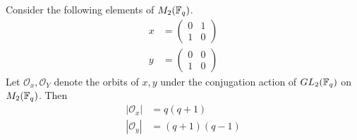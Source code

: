 \documentclass{amsart}
\begin{document}
\begin{lemma}\label{orbit-sizes}
    Consider the following elements of $M_2(\protect\mathbb{F}_q)$.
    \begin{align*}
        x &= 
        \begin{pmatrix}
            0 & 1 \\
            1 & 0
        \end{pmatrix} \\
        y &=
        \begin{pmatrix}
            0 & 0 \\
            1 & 0
        \end{pmatrix}
    \end{align*}
    Let $\mathcal{O}_x, \mathcal{O}_Y$ denote the orbits of $x, y$ under the conjugation action of $GL_2(\protect\mathbb{F}_q)$ on $M_2(\protect\mathbb{F}_q)$. Then
    \begin{align*}
        |\mathcal{O}_x| &= q(q + 1) \\
        |\mathcal{O}_y| &= (q + 1)(q - 1)
    \end{align*}
\end{lemma}
\end{document}
